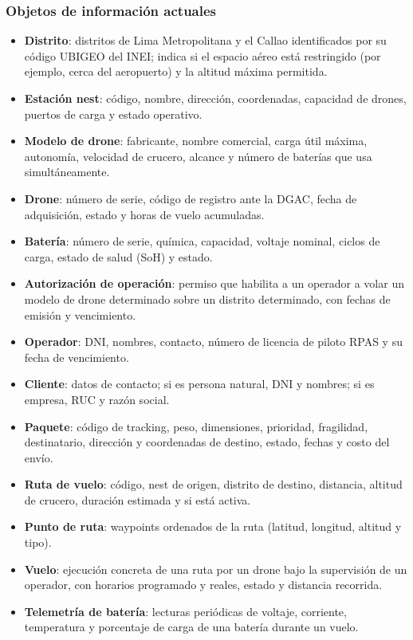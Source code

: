 \documentclass[11pt,a4paper]{article}
\begin{document}
\subsubsection{Objetos de información actuales}
\begin{itemize}
\item \textbf{Distrito}: distritos de Lima Metropolitana y el Callao identificados por su código UBIGEO del INEI; indica si el espacio aéreo está restringido (por ejemplo, cerca del aeropuerto) y la altitud máxima permitida.
\item \textbf{Estación nest}: código, nombre, dirección, coordenadas, capacidad de drones, puertos de carga y estado operativo.
\item \textbf{Modelo de drone}: fabricante, nombre comercial, carga útil máxima, autonomía, velocidad de crucero, alcance y número de baterías que usa simultáneamente.
\item \textbf{Drone}: número de serie, código de registro ante la DGAC, fecha de adquisición, estado y horas de vuelo acumuladas.
\item \textbf{Batería}: número de serie, química, capacidad, voltaje nominal, ciclos de carga, estado de salud (SoH) y estado.
\item \textbf{Autorización de operación}: permiso que habilita a un operador a volar un modelo de drone determinado sobre un distrito determinado, con fechas de emisión y vencimiento.
\item \textbf{Operador}: DNI, nombres, contacto, número de licencia de piloto RPAS y su fecha de vencimiento.
\item \textbf{Cliente}: datos de contacto; si es persona natural, DNI y nombres; si es empresa, RUC y razón social.
\item \textbf{Paquete}: código de tracking, peso, dimensiones, prioridad, fragilidad, destinatario, dirección y coordenadas de destino, estado, fechas y costo del envío.
\item \textbf{Ruta de vuelo}: código, nest de origen, distrito de destino, distancia, altitud de crucero, duración estimada y si está activa.
\item \textbf{Punto de ruta}: waypoints ordenados de la ruta (latitud, longitud, altitud y tipo).
\item \textbf{Vuelo}: ejecución concreta de una ruta por un drone bajo la supervisión de un operador, con horarios programado y reales, estado y distancia recorrida.
\item \textbf{Telemetría de batería}: lecturas periódicas de voltaje, corriente, temperatura y porcentaje de carga de una batería durante un vuelo.
\end{itemize}
\end{document}
